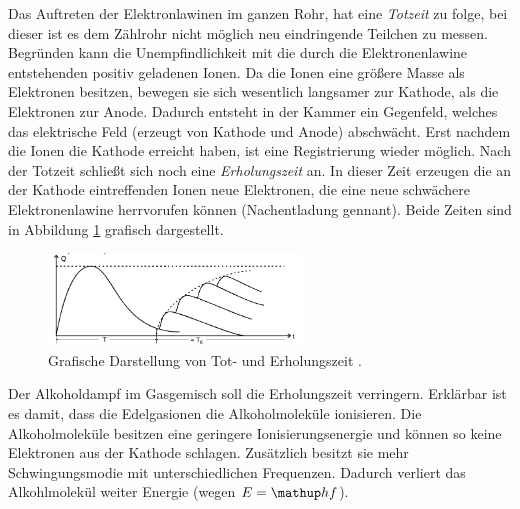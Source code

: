 Das Auftreten der Elektronlawinen im ganzen Rohr, hat eine \emph{Totzeit} zu folge, %
bei dieser ist es dem Zählrohr nicht möglich neu eindringende Teilchen %
zu messen. Begründen kann die Unempfindlichkeit mit die durch die Elektronenlawine entstehenden %
positiv geladenen Ionen. Da die Ionen eine größere Masse als Elektronen besitzen,
bewegen sie sich wesentlich langsamer zur Kathode, als die Elektronen
zur Anode. Dadurch entsteht in der Kammer ein Gegenfeld, welches das
elektrische Feld (erzeugt von Kathode und Anode) abschwächt.
Erst nachdem die Ionen die Kathode erreicht haben, ist eine
Registrierung wieder möglich. Nach der Totzeit schließt sich
noch eine \emph{Erholungszeit} an. In dieser Zeit erzeugen
die an der Kathode eintreffenden Ionen neue Elektronen, die eine neue
schwächere Elektronenlawine herrvorufen können (Nachentladung gennant). Beide Zeiten sind %
in Abbildung \ref{fig: tot_und_erholungszeit} grafisch dargestellt.
\begin{figure}
  \centering
  \includegraphics[width=0.6\textwidth]{bilder/totzeit.png}
  \caption{Grafische Darstellung von Tot- und Erholungszeit \cite{anleitung703}.}
  \label{fig: tot_und_erholungszeit}
  \end{figure}

Der Alkoholdampf im Gasgemisch soll die Erholungszeit verringern. Erklärbar ist es damit, dass %
die Edelgasionen die Alkoholmoleküle ionisieren. Die Alkoholmoleküle
besitzen eine geringere Ionisierungsenergie und können so keine Elektronen aus
der Kathode schlagen. Zusätzlich besitzt sie mehr Schwingungsmodie %
mit unterschiedlichen Frequenzen. Dadurch verliert das Alkohlmolekül %
weiter Energie (wegen $E=\map{h}f$). %

